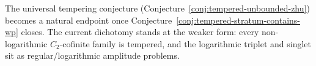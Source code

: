 The universal tempering conjecture
(Conjecture~\ref{conj:tempered-unbounded-zhu}) becomes a natural
endpoint once Conjecture~\ref{conj:tempered-stratum-contains-wp}
closes. The current dichotomy stands at the weaker form: every
non-logarithmic $C_2$-cofinite family is tempered, and the
logarithmic triplet and singlet sit as regular/logarithmic amplitude
problems.
